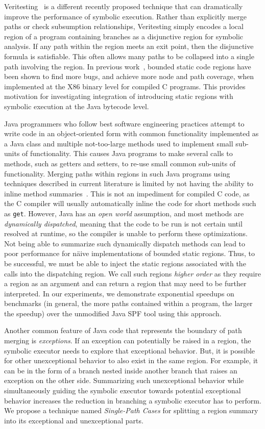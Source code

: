 %
Veritesting~\cite{veritesting} is a different recently proposed technique that can dramatically improve the performance of symbolic execution.  Rather than explicitly merge paths or check subsumption relationships, Veritesting simply encodes a local region of a program containing branches as a disjunctive region for symbolic analysis.  If any path within the region meets an exit point, then the disjunctive formula is satisfiable.  This often allows many paths to be collapsed into a single path involving the region.  
%
In previous work~\cite{veritesting}, bounded static code regions have been shown to find more bugs, and achieve more
node and path coverage, when implemented at the X86 binary level for compiled C programs.
%
This provides motivation for investigating integration of introducing static regions with symbolic execution at the Java
bytecode level.

Java programmers who follow best software engineering practices attempt to write code in an object-oriented
form with common functionality implemented as a Java class and multiple not-too-large methods used to implement small
sub-units of functionality.
%
This causes Java programs to make several calls to methods, such as getters and setters, to re-use small common sub-units
of functionality.
%
Merging paths within regions in such Java programs using techniques described in current literature is limited by not having the ability
to inline method summaries~\cite{sharma-veritesting}.
%
This is not an impediment for compiled C code, as the C compiler will usually automatically inline the code for short
methods such as \texttt{get}.
%
However, Java has an {\em open world} assumption, and most methods are {\em dynamically dispatched}, meaning that the code to be
run is not certain until resolved at runtime, so the compiler is unable to perform these optimizations.
%
Not being able to summarize such dynamically dispatch methods can lead to poor performance for
n\"aive implementations of bounded static regions.
%
Thus, to be successful, we must be able to inject the static regions associated with the calls into the dispatching
region.
%
We call such regions {\em higher order} as they require a region as an argument and can return a region that may need
to be further interpreted.
%
In our experiments, we demonstrate exponential speedups on benchmarks (in general, the more paths contained within a
program, the larger the speedup) over the unmodified Java SPF tool using this approach.

Another common feature of Java code that represents the boundary of path merging is \textit{exceptions}.
%
If an exception can potentially be raised in a region, the symbolic executor needs to explore that exceptional behavior.
%
But, it is possible for other unexceptional behavior to also exist in the same region.
%
For example, it can be in the form of a branch nested inside another branch that raises an exception on the other side.
%
Summarizing such unexceptional behavior while simultaneously guiding the symbolic executor towards potential exceptional
behavior increases the reduction in branching a symbolic executor has to perform.
%
We propose a technique named \textit{Single-Path Cases} for splitting a region summary into its exceptional and
unexceptional parts.

